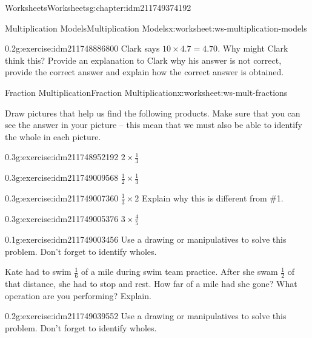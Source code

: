 \documentclass[twoside,11pt,]{book}
\begin{document}
\begin{chapterptx}{Worksheets}{}{Worksheets}{}{}{g:chapter:idm211749374192}
\begin{worksheet-section-numberless}{Multiplication Models}{}{Multiplication Models}{}{}{x:worksheet:ws-multiplication-models}
\begin{divisionexercise}{18}{}{0.2}{g:exercise:idm211748886800}
Clark says \(10 \times 4.7=4.70 \). Why might Clark think this? Provide an explanation to Clark why his answer is not correct, provide the correct answer and explain how the correct answer is obtained.%
\end{divisionexercise}%
\end{worksheet-section-numberless}
\restoregeometry
%
%
\typeout{************************************************}
\typeout{************************************************}
%
\begin{worksheet-section-numberless}{Fraction Multiplication}{}{Fraction Multiplication}{}{}{x:worksheet:ws-mult-fractions}
\begin{introduction}{}%
Draw pictures that help us find the following products.  Make sure that you can see the answer in your picture – this mean that we must also be able to identify the whole in each picture.%
\end{introduction}%
\begin{divisionexercise}{1}{}{0.3}{g:exercise:idm211748952192}%
\(2 \times \frac{1}{3} \)%
\end{divisionexercise}%
\begin{divisionexercise}{2}{}{0.3}{g:exercise:idm211749009568}%
\(\frac{1}{2} \times \frac{1}{3} \)%
\end{divisionexercise}%
\clearpage
\begin{divisionexercise}{3}{}{0.3}{g:exercise:idm211749007360}%
\(\frac{1}{3} \times 2  \)  Explain why this is different from \#1.%
\end{divisionexercise}%
\begin{divisionexercise}{4}{}{0.3}{g:exercise:idm211749005376}%
\(3 \times \frac{4}{5} \)%
\end{divisionexercise}%
\begin{divisionexercise}{5}{}{0.1}{g:exercise:idm211749003456}%
Use a drawing or manipulatives to solve this problem. Don’t forget to identify wholes.%
\par
Kate had to swim \(\frac{1}{6} \) of a mile during swim team practice.  After she swam \(\frac{1}{2} \) of that distance, she had to stop and rest. How far of a mile had she gone? What operation are you performing? Explain.%
\end{divisionexercise}%
\clearpage
\begin{divisionexercise}{6}{}{0.2}{g:exercise:idm211749039552}%
Use a drawing or manipulatives to solve this problem. Don’t forget to identify wholes.%

\end{divisionexercise}
\end{worksheet-section-numberless}
\end{chapterptx}
\end{document}

